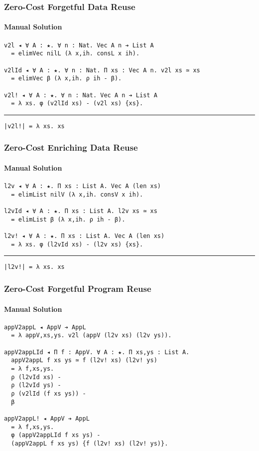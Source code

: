 \documentclass[mathserif,usenames,dvipsnames]{beamer}
\begin{document}
\begin{frame}[fragile]
\frametitle{Zero-Cost Forgetful Data Reuse}
\framesubtitle{Manual Solution}

\begin{verbatim}
v2l ◂ ∀ A : ★. ∀ n : Nat. Vec A n ➔ List A
  = elimVec nilL (λ x,ih. consL x ih).

v2lId ◂ ∀ A : ★. ∀ n : Nat. Π xs : Vec A n. v2l xs ≃ xs 
  = elimVec β (λ x,ih. ρ ih - β).

v2l! ◂ ∀ A : ★. ∀ n : Nat. Vec A n ➔ List A
  = λ xs. φ (v2lId xs) - (v2l xs) {xs}.
\end{verbatim}

\noindent\rule{\textwidth}{1pt}

\begin{verbatim}
|v2l!| = λ xs. xs
\end{verbatim}

\end{frame}

\begin{frame}[fragile]
\frametitle{Zero-Cost Enriching Data Reuse}
\framesubtitle{Manual Solution}

\begin{verbatim}
l2v ◂ ∀ A : ★. Π xs : List A. Vec A (len xs)
  = elimList nilV (λ x,ih. consV x ih).

l2vId ◂ ∀ A : ★. Π xs : List A. l2v xs ≃ xs 
  = elimList β (λ x,ih. ρ ih - β).

l2v! ◂ ∀ A : ★. Π xs : List A. Vec A (len xs)
  = λ xs. φ (l2vId xs) - (l2v xs) {xs}.
\end{verbatim}

\noindent\rule{\textwidth}{1pt}

\begin{verbatim}
|l2v!| = λ xs. xs
\end{verbatim}

\end{frame}

\begin{frame}[fragile]
\frametitle{Zero-Cost Forgetful Program Reuse}
\framesubtitle{Manual Solution}

\begin{verbatim}
appV2appL ◂ AppV ➔ AppL
  = λ appV,xs,ys. v2l (appV (l2v xs) (l2v ys)).

appV2appLId ◂ Π f : AppV. ∀ A : ★. Π xs,ys : List A. 
  appV2appL f xs ys ≃ f (l2v! xs) (l2v! ys)
  = λ f,xs,ys.        
  ρ (l2vId xs) -      
  ρ (l2vId ys) -      
  ρ (v2lId (f xs ys)) -
  β

appV2appL! ◂ AppV ➔ AppL
  = λ f,xs,ys.
  φ (appV2appLId f xs ys) - 
  (appV2appL f xs ys) {f (l2v! xs) (l2v! ys)}.
\end{verbatim}

\end{frame}
\end{document}
